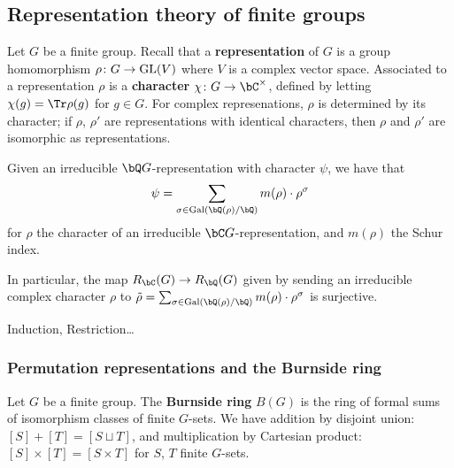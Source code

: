 \subsection{Representation theory of finite groups}\label{rep}

Let $G$ be a finite group. Recall that a \textbf{representation} of $G$ is a group homomorphism $\rho \colon G \to \mathrm{GL}(V)$ where $V$ is a complex vector space. Associated to a representation $\rho$ is a \textbf{character} $\chi \colon G \to \bC^{\times}$, defined by letting $\chi(g) = \Tr \rho(g)$ for $g \in G$. For complex represenations, $\rho$ is determined by its character; if $\rho$, $\rho'$ are representations with identical characters, then $\rho$ and $\rho'$ are isomorphic as representations. 


Given an irreducible $\bQ G$-representation with character $\psi$, we have that 
\[\psi =  \sum_{\sigma \in \Gal(\bQ(\rho)/\bQ)}m(\rho)\cdot \rho^\sigma \]
for $\rho$ the character of an irreducible $\bC G$-representation, and $m(\rho)$ the Schur index.

In particular, the map $R_{\bC}(G) \to R_{\bQ}(G)$ given by sending an irreducible complex character $\rho$ to 
$\tilde{\rho} = \sum_{\sigma \in \Gal(\bQ(\rho)/\bQ)}m(\rho)\cdot \rho^\sigma$ is surjective.


Induction, Restriction\dots

\begin{thm} 


\end{thm} 


\subsubsection{Permutation representations and the Burnside ring}

Let $G$ be a finite group. The \textbf{Burnside ring} $B(G)$ is the ring of formal sums of isomorphism classes of finite $G$-sets. We have addition by disjoint union: $[S] + [T] = [S \sqcup T]$, and multiplication by Cartesian product: $[S] \times [T] = [S \times T]$ for $S$, $T$ finite $G$-sets. 

